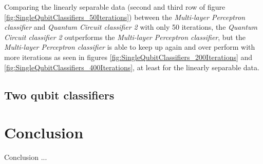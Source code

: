 Comparing the linearly separable data (second and third row of figure \ref{fig:SingleQubitClassifiers_50Iterations}) between the \textit{Multi-layer Perceptron classifier} and \textit{Quantum Circuit classifier 2} with only 50 iterations, the \textit{Quantum Circuit classifier 2} outperforms the \textit{Multi-layer Perceptron classifier}, but the \textit{Multi-layer Perceptron classifier} is able to keep up again and over perform with more iterations as seen in figures \ref{fig:SingleQubitClassifiers_200Iterations} and \ref{fig:SingleQubitClassifiers_400Iterations}, at least for the linearly separable data.

\subsection{Two qubit classifiers}


\section{Conclusion}
Conclusion ...
